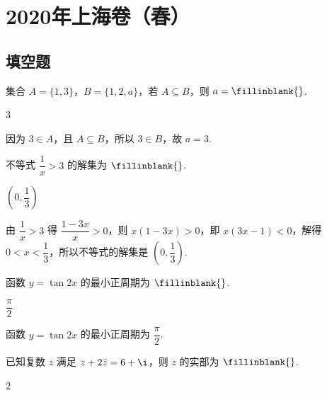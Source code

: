 \chapter{2020年上海卷（春）}

\section{填空题}

\begin{problem}
集合 \(A=\{1,3\}\)，\(B=\{1,2,a\}\)，若 \(A\subseteq B\)，则 \(a=\fillinblank{}\).
\end{problem}

\begin{answer}
\(3\)
\end{answer}

\begin{solution}
因为 \(3\in A\)，且 \(A\subseteq B\)，所以 \(3\in B\)，故 \(a=3\).
\end{solution}

\begin{problem}
不等式 \(\dfrac{1}{x}>3\) 的解集为 \(\fillinblank{}\).
\end{problem}

\begin{answer}
\(\left(0,\dfrac{1}{3}\right)\)
\end{answer}

\begin{solution}
由 \(\dfrac{1}{x}>3\) 得 \(\dfrac{1-3x}{x}>0\)，则 \(x(1-3x)>0\)，即 \(x(3x-1)<0\)，解得 \(0<x<\dfrac{1}{3}\)，所以不等式的解集是 \(\left(0,\dfrac{1}{3}\right)\).
\end{solution}

\begin{problem}
函数 \(y=\tan 2x\) 的最小正周期为 \(\fillinblank{}\).
\end{problem}

\begin{answer}
\(\dfrac{\pi}{2}\)
\end{answer}

\begin{solution}
函数 \(y=\tan 2x\) 的最小正周期为 \(\dfrac{\pi}{2}\).
\end{solution}

\begin{problem}
已知复数 \(z\) 满足 \(z+2\bar z=6+\i\)，则 \(z\) 的实部为 \(\fillinblank{}\).
\end{problem}

\begin{answer}
\(2\)
\end{answer}

